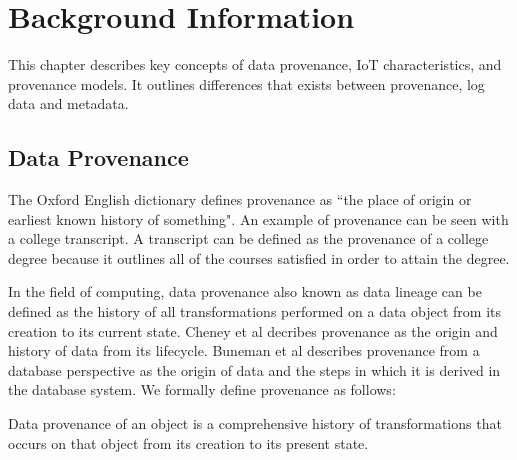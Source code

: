 \chapter{Background Information}

This chapter describes key concepts of data provenance, IoT characteristics, and provenance models. It outlines differences that exists between provenance, log data and metadata. 

\section{Data Provenance}
The Oxford English dictionary defines provenance \cite{TCDP1999} as ``the place of origin or earliest known history of something".  An example of provenance can be seen with a college transcript. A transcript can be defined as the provenance of a college degree because it outlines all of the courses satisfied in order to attain the degree.
\par In the field of computing, data provenance also known as  data lineage can be defined as the history of all transformations performed on a data object from its creation to its current state. Cheney et al \cite{cheney_provenance_2009} decribes provenance as the origin and history of data from its lifecycle. Buneman et al \cite{buneman_why_2001} describes provenance from a database perspective as the origin of data and the steps in which it is derived in the database system.  We formally define provenance as follows:


\begin{definition}

Data provenance of an object is a comprehensive history of transformations that occurs on that object from its creation to its present state.

\end{definition}

